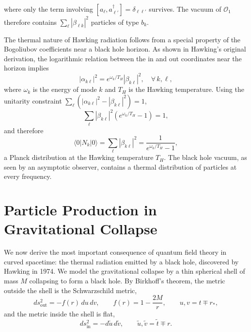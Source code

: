 where only the term involving $[a_\ell, a_{\ell'}^\dagger]
= \delta_{\ell\ell'}$ survives. The vacuum of $\mathcal{O}_1$
therefore contains $\sum_\ell|\beta_{\ell k}|^2$ particles of type
$b_k$.

The thermal nature of Hawking radiation follows from a special property
of the Bogoliubov coefficients near a black hole horizon. As shown in
Hawking's original derivation, the logarithmic relation between the
in and out coordinates near the horizon implies
\begin{equation}
    |\alpha_{k\ell}|^2 = e^{\omega_k/T_H}|\beta_{k\ell}|^2,
    \quad \forall\, k,\ell,
\end{equation}
where $\omega_k$ is the energy of mode $k$ and $T_H$ is the Hawking
temperature. Using the unitarity constraint
$\sum_\ell(|\alpha_{k\ell}|^2 - |\beta_{k\ell}|^2) = 1$,
\begin{equation}
    \sum_\ell|\beta_{k\ell}|^2\left(e^{\omega_k/T_H} - 1\right) = 1,
\end{equation}
and therefore
\begin{equation}
    \boxed{\langle 0|N_k|0\rangle
    = \sum_\ell|\beta_{k\ell}|^2
    = \frac{1}{e^{\omega_k/T_H}-1},}
\end{equation}
a Planck distribution at the Hawking temperature $T_H$. The black hole
vacuum, as seen by an asymptotic observer, contains a thermal
distribution of particles at every frequency.

\section{Particle Production in Gravitational Collapse}

We now derive the most important consequence of quantum field theory
in curved spacetime: the thermal radiation emitted by a black hole,
discovered by Hawking in 1974. We model the gravitational collapse by
a thin spherical shell of mass $M$ collapsing to form a black hole.
By Birkhoff's theorem, the metric outside the shell is the
Schwarzschild metric,
\begin{equation}
    ds^2_{\text{out}} = -f(r)\,du\,dv,
    \qquad f(r) = 1 - \frac{2M}{r},
    \qquad u,v = t\mp r_*,
\end{equation}
and the metric inside the shell is flat,
\begin{equation}
    ds^2_{\text{in}} = -d\tilde u\,d\tilde v,
    \qquad \tilde u,\tilde v = \tilde t\mp r.
\end{equation}

